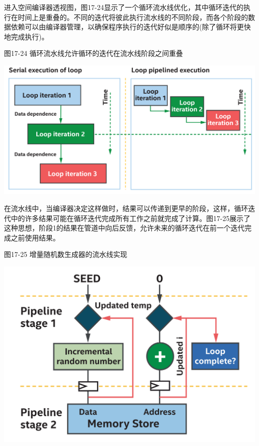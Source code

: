 进入空间编译器透视图，图17-24显示了一个循环流水线优化，其中循环迭代的执行在时间上是重叠的。不同的迭代将彼此执行流水线的不同阶段，而各个阶段的数据依赖可以由编译器管理，以确保程序执行的迭代好似是顺序的(除了循环将更快地完成执行)。\par

\hspace*{\fill} \par %
图17-24 循环流水线允许循环的迭代在流水线阶段之间重叠
\begin{center}
	\includegraphics[width=1.0\textwidth]{content/chapter-17/images/19}
\end{center}

在流水线中，当编译器决定这样做时，结果可以传递到更早的阶段，这样，循环迭代中的许多结果可能在循环迭代完成所有工作之前就完成了计算。图17-25展示了这种思想，阶段1的结果在管道中向后反馈，允许未来的循环迭代在前一个迭代完成之前使用结果。\par

\hspace*{\fill} \par %
图17-25 增量随机数生成器的流水线实现
\begin{center}
	\includegraphics[width=1.0\textwidth]{content/chapter-17/images/20}
\end{center}

